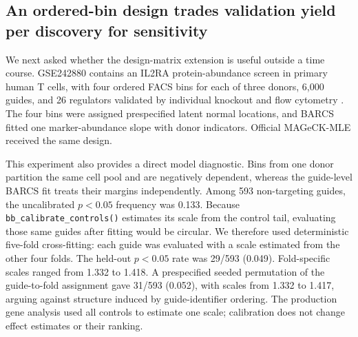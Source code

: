 \subsection{An ordered-bin design trades validation yield per discovery for
sensitivity}
\label{sec:facs}

We next asked whether the design-matrix extension is useful outside a time
course.  GSE242880 contains an IL2RA protein-abundance screen in primary human
T cells, with four ordered FACS bins for each of three donors, 6,000 guides,
and 26 regulators validated by individual knockout and flow cytometry
\citep{freimer2022il2ra,pimentel2024waterbear}.  The four bins were assigned
prespecified latent normal locations, and BARCS fitted one marker-abundance
slope with donor indicators.  Official MAGeCK-MLE received the same design.

This experiment also provides a direct model diagnostic.  Bins from one donor
partition the same cell pool and are negatively dependent, whereas the
guide-level BARCS fit treats their margins independently.  Among 593
non-targeting guides, the uncalibrated $p<0.05$ frequency was 0.133.  Because
\texttt{bb\_calibrate\_controls()} estimates its scale from the control tail,
evaluating those same guides after fitting would be circular.  We therefore
used deterministic five-fold cross-fitting: each guide was evaluated with a
scale estimated from the other four folds.  The held-out $p<0.05$ rate was
29/593 (0.049).  Fold-specific scales ranged from 1.332 to 1.418.  A
prespecified seeded permutation of the guide-to-fold assignment gave 31/593
(0.052), with scales from 1.332 to 1.417, arguing against structure induced by
guide-identifier ordering.  The production gene analysis used all controls to
estimate one scale; calibration does not change effect estimates or their
ranking.

